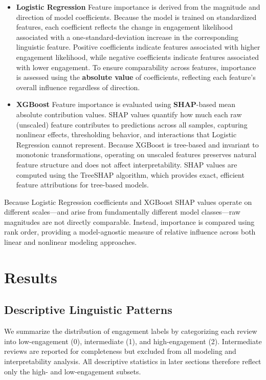 \documentclass[12pt]{article}
\begin{document}
\begin{itemize}
\item \textbf{Logistic Regression}  
Feature importance is derived from the magnitude and direction of model coefficients. Because the model is trained on standardized features, each coefficient reflects the change in engagement likelihood associated with a one-standard-deviation increase in the corresponding linguistic feature. Positive coefficients indicate features associated with higher engagement likelihood, while negative coefficients indicate features associated with lower engagement. To ensure comparability across features, importance is assessed using the \textbf{absolute value} of coefficients, reflecting each feature's overall influence regardless of direction. 

\item \textbf{XGBoost}  
Feature importance is evaluated using \textbf{SHAP}-based mean absolute contribution values. SHAP values quantify how much each raw (unscaled) feature contributes to predictions across all samples, capturing nonlinear effects, thresholding behavior, and interactions that Logistic Regression cannot represent. Because XGBoost is tree-based and invariant to monotonic transformations, operating on unscaled features preserves natural feature structure and does not affect interpretability. SHAP values are computed using the TreeSHAP algorithm, which provides exact, efficient feature attributions for tree-based models.
\end{itemize}

Because Logistic Regression coefficients and XGBoost SHAP values operate on different scales—and arise from fundamentally different model classes—raw magnitudes are not directly comparable. Instead, importance is compared using rank order, providing a model-agnostic measure of relative influence across both linear and nonlinear modeling approaches.


\section{Results}

\subsection{Descriptive Linguistic Patterns}

We summarize the distribution of engagement labels by categorizing each review into low-engagement (0), intermediate (1), and high-engagement (2). Intermediate reviews are reported for completeness but excluded from all modeling and interpretability analysis. All descriptive statistics in later sections therefore reflect only the high- and low-engagement subsets.
\end{document}
